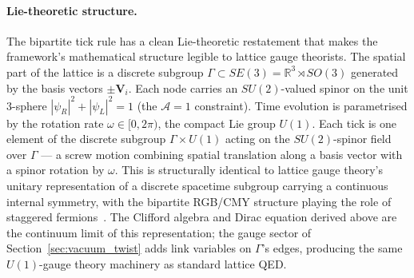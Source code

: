\paragraph{Lie-theoretic structure.}
The bipartite tick rule has a clean Lie-theoretic restatement that
makes the framework's mathematical structure legible to lattice gauge
theorists.  The spatial part of the lattice is a discrete subgroup
$\Gamma \subset SE(3) = \mathbb{R}^3 \rtimes SO(3)$ generated by the
basis vectors $\pm \mathbf{V}_i$.  Each node carries an
$SU(2)$-valued spinor on the unit 3-sphere
$|\psi_R|^2 + |\psi_L|^2 = 1$ (the $\mathcal{A}=1$ constraint).
Time evolution is parametrised by the rotation rate
$\omega \in [0, 2\pi)$, the compact Lie group $U(1)$.  Each tick is
one element of the discrete subgroup $\Gamma \times U(1)$ acting on
the $SU(2)$-spinor field over $\Gamma$ --- a screw motion combining
spatial translation along a basis vector with a spinor rotation by
$\omega$.  This is structurally identical to lattice gauge theory's
unitary representation of a discrete spacetime subgroup carrying a
continuous internal symmetry, with the bipartite RGB/CMY structure
playing the role of staggered fermions~\cite{kogutsusskind1975,
susskind1977}.  The Clifford algebra and Dirac equation derived
above are the continuum limit of this representation; the gauge
sector of Section~\ref{sec:vacuum_twist} adds link variables on
$\Gamma$'s edges, producing the same $U(1)$-gauge theory machinery
as standard lattice QED.
